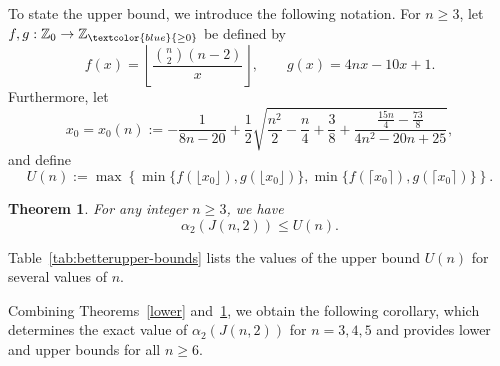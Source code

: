 \documentclass{article}
\newtheorem{theorem}{Theorem}[section]
\newcommand{\blue}[1]{\textcolor{blue}{#1}}
\newcommand{\red}[1]{\textcolor{red}{#1}}
\def\greeen{\textcolor[RGB]{47, 141, 26 }}
\def\com{\textcolor{purple}}
\begin{document}

To state the upper bound, we introduce the following notation. For $n\ge3$, let
$f,g:\mathbb{Z}_{0}\to\mathbb{Z}_{\blue{\geq0}}$ be defined by
$$
f(x)=\left\lfloor\frac{\binom{n}{2}(n-2)}{x}\right\rfloor,
\qquad
g(x)=4nx-10x+1.
$$
Furthermore, let
$$
x_0=x_0(n):=-
\frac{1}{8n-20}
+\frac12\sqrt{
\frac{n^2}{2}
-\frac n4
+\frac38
+\frac{\frac{15n}{4}-\frac{73}{8}}{4n^2-20n+25}},
$$
and define
$$
U(n):=
\max\left\{
\min\{f(\lfloor x_0\rfloor),g(\lfloor x_0\rfloor)\},
\min\{f(\lceil x_0\rceil),g(\lceil x_0\rceil)\}
\right\}.
$$
\begin{theorem}\label{teoupperbounds}
For any integer $n\geq 3$, we have 
$$\alpha_2(J(n,2)) \leq  U(n).$$

\end{theorem}



Table~\ref{tab:betterupper-bounds} lists the values of the upper bound $U(n)$ for several values of $n$.

Combining Theorems~\ref{lower} and~\ref{teoupperbounds}, we obtain the following corollary, which determines the exact value of $\alpha_2(J(n,2))$ for $n=3,4,5$ and provides lower and upper bounds for all $n\ge6$.




    
    
\end{document}
